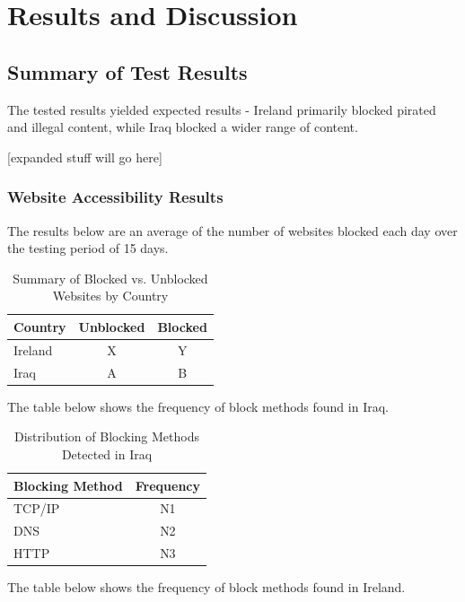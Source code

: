 \chapter{Results and Discussion}

\section{Summary of Test Results}

The tested results yielded expected results - Ireland primarily blocked pirated and illegal content, while Iraq blocked a wider range of content.

[expanded stuff will go here]

\subsection{Website Accessibility Results}

The results below are an average of the number of websites blocked each day over the testing period of 15 days.

\begin{table}[H]
\centering
\caption{Summary of Blocked vs. Unblocked Websites by Country}
\begin{tabular}{lcc}
\toprule
\textbf{Country} & \textbf{Unblocked} & \textbf{Blocked} \\
\midrule
Ireland & X & Y \\
Iraq    & A & B \\
\bottomrule
\end{tabular}
\label{tab:blocked_summary}
\end{table}

The table below shows the frequency of block methods found in Iraq.

\begin{table}[H]
\centering
\caption{Distribution of Blocking Methods Detected in Iraq}
\begin{tabular}{lc}
\toprule
\textbf{Blocking Method} & \textbf{Frequency} \\
\midrule
TCP/IP          & N1 \\
DNS & N2 \\
HTTP & N3 \\
\bottomrule
\end{tabular}
\label{tab:iraq_blocking_methods}
\end{table}

The table below shows the frequency of block methods found in Ireland.


